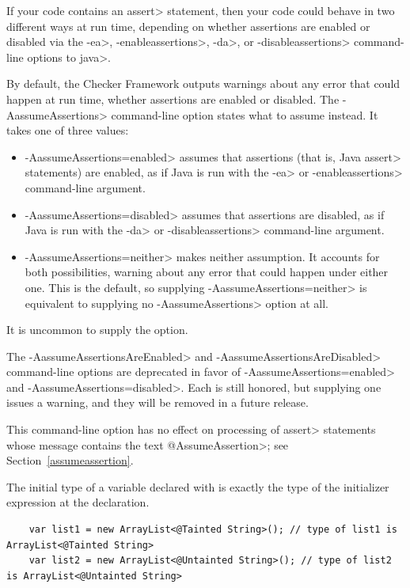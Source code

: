 If your code contains an \<assert> statement, then your code could behave
in two different ways at run time, depending on whether assertions are
enabled or disabled via the \<-ea>, \<-enableassertions>, \<-da>, or
\<-disableassertions> command-line options to \<java>.

By default, the Checker Framework outputs warnings about any error that
could happen at run time, whether assertions are enabled or disabled.  The
\<-AassumeAssertions> command-line option states what to assume instead.  It
takes one of three values:

\begin{itemize}
  \item
  \<-AassumeAssertions=enabled> assumes that assertions (that is, Java
  \<assert> statements) are enabled, as if Java is run with the \<-ea> or
  \<-enableassertions> command-line argument.
  \item
  \<-AassumeAssertions=disabled> assumes that assertions are disabled, as if
  Java is run with the \<-da> or \<-disableassertions> command-line argument.
  \item
  \<-AassumeAssertions=neither> makes neither assumption.  It accounts for
  both possibilities, warning about any error that could happen under either
  one.  This is the default, so supplying \<-AassumeAssertions=neither> is
  equivalent to supplying no \<-AassumeAssertions> option at all.
\end{itemize}

\noindent
It is uncommon to supply the option.

The \<-AassumeAssertionsAreEnabled> and \<-AassumeAssertionsAreDisabled>
command-line options are deprecated in favor of \<-AassumeAssertions=enabled>
and \<-AassumeAssertions=disabled>.  Each is still honored, but supplying one
issues a warning, and they will be removed in a future release.

This command-line option has no effect on processing of \<assert>
statements whose message contains the text \<@AssumeAssertion>; see
Section~\ref{assumeassertion}.



The initial type of a variable declared with  is exactly
the type of the initializer expression at the declaration.

\begin{Verbatim}
    var list1 = new ArrayList<@Tainted String>(); // type of list1 is ArrayList<@Tainted String>
    var list2 = new ArrayList<@Untainted String>(); // type of list2 is ArrayList<@Untainted String>
\end{Verbatim}

